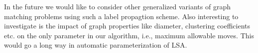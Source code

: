 In the future we would like to consider other generalized variants of graph matching problems using such a label propagtion scheme. Also interesting to investigate is the impact of graph properties like diameter, clustering coefficients etc. on the only parameter in our algorithm, i.e., maximum allowable moves. This would go a long way in automatic parameterization of LSA.


%
%  
